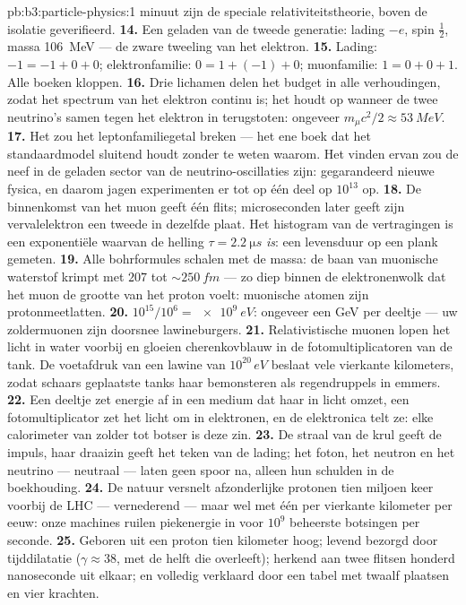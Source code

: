 \begin{solution}{pb:b3:particle-physics:1}
minuut zijn de speciale relativiteitstheorie, boven de isolatie geverifieerd.
\textbf{14.} Een geladen  van de tweede generatie:
lading $-e$, spin $\tfrac12$, massa \qty{106}{MeV} --- de
zware tweeling van het elektron.
\textbf{15.} Lading: $-1 = -1 + 0 + 0$; elektronfamilie:
$0 = 1 + (-1) + 0$; muonfamilie: $1 = 0 + 0 + 1$. Alle boeken
kloppen.
\textbf{16.} Drie lichamen delen het budget in alle verhoudingen,
zodat het spectrum van het elektron continu is; het houdt op wanneer de twee
neutrino's samen tegen het elektron in terugstoten: ongeveer
$m_\mu c^2/2 \approx \qty{53}{MeV}$.
\textbf{17.} Het zou het leptonfamiliegetal breken --- het ene
boek dat het standaardmodel sluitend houdt zonder te weten waarom. Het vinden
ervan zou de neef in de geladen sector van de neutrino-oscillaties zijn:
gegarandeerd nieuwe fysica, en daarom jagen experimenten er tot op
één deel op $10^{13}$ op.
\textbf{18.} De binnenkomst van het muon geeft één flits; microseconden
later geeft zijn vervalelektron een tweede in dezelfde plaat. Het
histogram van de vertragingen is een exponentiële waarvan de helling
$\tau = \qty{2.2}{\micro s}$ \emph{is}: een levensduur op een plank gemeten.
\textbf{19.} Alle bohrformules schalen met de massa: de baan van
muonische waterstof krimpt met $207$ tot ${\sim}\qty{250}{fm}$ ---
zo diep binnen de elektronenwolk dat het muon de grootte van het
proton voelt: muonische atomen zijn protonmeetlatten.
\textbf{20.} $10^{15}/10^{6} = \qty{e9}{eV}$: ongeveer een GeV per
deeltje --- uw zoldermuonen zijn doorsnee lawineburgers.
\textbf{21.} Relativistische muonen lopen het licht in water voorbij en gloeien
cherenkovblauw in de fotomultiplicatoren van de tank. De
voetafdruk van een lawine van $10^{20}\,\unit{eV}$ beslaat vele vierkante
kilometers, zodat schaars geplaatste tanks haar bemonsteren als regendruppels in
emmers.
\textbf{22.} Een deeltje zet energie af in een medium dat haar
in licht omzet, een fotomultiplicator zet het licht om in
elektronen, en de elektronica telt ze: elke calorimeter van
zolder tot botser is deze zin.
\textbf{23.} De straal van de krul geeft de impuls, haar draaizin geeft
het teken van de lading; het foton, het neutron en het neutrino ---
neutraal --- laten geen spoor na, alleen hun schulden in de
boekhouding.
\textbf{24.} De natuur versnelt afzonderlijke protonen tien miljoen
keer voorbij de LHC --- vernederend --- maar wel met één per vierkante
kilometer per eeuw: onze machines ruilen piekenergie in voor
$10^{9}$ beheerste botsingen per seconde.
\textbf{25.} Geboren uit een proton tien kilometer hoog; levend
bezorgd door tijddilatatie ($\gamma \approx 38$, met de helft die overleeft);
herkend aan twee flitsen honderd nanoseconde uit elkaar; en volledig
verklaard door een tabel met twaalf plaatsen en vier
krachten.
\end{solution}
